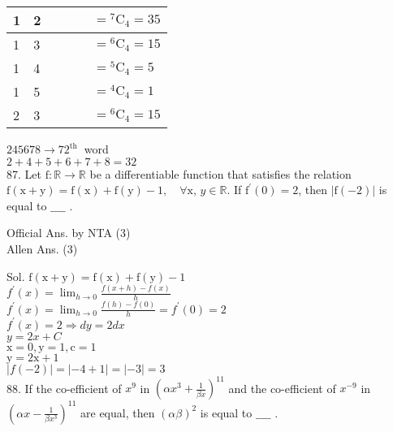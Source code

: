 \documentclass[10pt]{article}
\begin{document}
\begin{center}
\begin{tabular}{|l|l|l|l|l|l|}
\hline
1 & 2 &  &  &  & \(={ }^{7} \mathrm{C}_{4}=35\) \\
\hline
1 & 3 &  &  &  & \(={ }^{6} \mathrm{C}_{4}=15\) \\
\hline
1 & 4 &  &  &  & \(={ }^{5} \mathrm{C}_{4}=5\) \\
\hline
1 & 5 &  &  &  & \(={ }^{4} \mathrm{C}_{4}=1\) \\
\hline
2 & 3 &  &  &  & \(={ }^{6} \mathrm{C}_{4}=15\) \\
\hline
\end{tabular}
\end{center}

\(245678 \rightarrow 72^{\text {th }}\) word\\
\(2+4+5+6+7+8=32\)\\
87. Let \(\mathrm{f}: \mathbb{R} \rightarrow \mathbb{R}\) be a differentiable function that satisfies the relation \(\mathrm{f}(\mathrm{x}+\mathrm{y})=\mathrm{f}(\mathrm{x})+\mathrm{f}(\mathrm{y})-1, \quad \forall \mathrm{x}\), \(y \in \mathbb{R}\). If \(\mathrm{f}^{\prime}(0)=2\), then \(|\mathrm{f}(-2)|\) is equal to \(\_\_\_\_\) .

Official Ans. by NTA (3)\\
Allen Ans. (3)

Sol. \(\mathrm{f}(\mathrm{x}+\mathrm{y})=\mathrm{f}(\mathrm{x})+\mathrm{f}(\mathrm{y})-1\)\\
\(f^{\prime}(x)=\lim _{h \rightarrow 0} \frac{f(x+h)-f(x)}{h}\)\\
\(f^{\prime}(x)=\lim _{h \rightarrow 0} \frac{f(h)-f(0)}{h}=f^{\prime}(0)=2\)\\
\(f^{\prime}(x)=2 \Rightarrow d y=2 d x\)\\
\(y=2 x+C\)\\
\(\mathrm{x}=0, \mathrm{y}=1, \mathrm{c}=1\)\\
\(\mathrm{y}=2 \mathrm{x}+1\)\\
\(|f(-2)|=|-4+1|=|-3|=3\)\\
88. If the co-efficient of \(x^{9}\) in \(\left(\alpha x^{3}+\frac{1}{\beta x}\right)^{11}\) and the co-efficient of \(x^{-9}\) in \(\left(\alpha x-\frac{1}{\beta x^{3}}\right)^{11}\) are equal, then \((\alpha \beta)^{2}\) is equal to \(\_\_\_\_\) .
\end{document}
